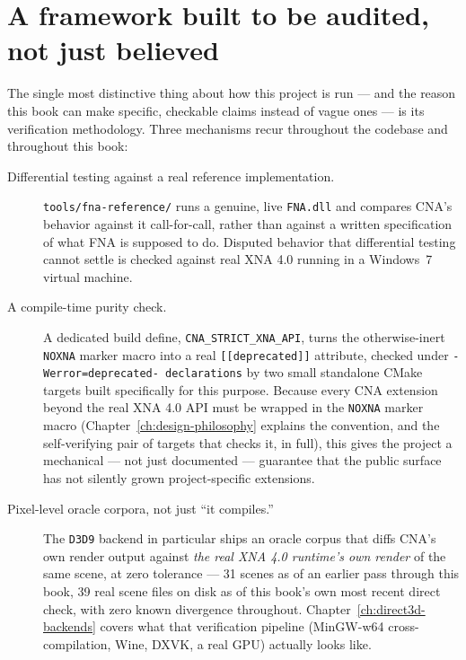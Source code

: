 \section{A framework built to be audited, not just believed}

The single most distinctive thing about how this project is run --- and the reason this book
can make specific, checkable claims instead of vague ones --- is its verification
methodology. Three mechanisms recur throughout the codebase and throughout this book:

\begin{description}
  \item[Differential testing against a real reference implementation.] \texttt{tools/fna-reference/}
        runs a genuine, live \texttt{FNA.dll} and compares CNA's behavior against it
        call-for-call, rather than against a written specification of what FNA is supposed to
        do. Disputed behavior that differential testing cannot settle is checked against real
        XNA 4.0 running in a Windows~7 virtual machine.
  \item[A compile-time purity check.] A dedicated build define, \texttt{CNA\_STRICT\_XNA\_API},
        turns the otherwise-inert \texttt{NOXNA} marker macro into a real
        \texttt{[[deprecated]]} attribute, checked under \texttt{-Werror=deprecated-%
        declarations} by two small standalone CMake targets built specifically for this
        purpose. Because every CNA extension beyond the real XNA 4.0 API must be wrapped in the
        \texttt{NOXNA} marker macro (Chapter~\ref{ch:design-philosophy} explains the
        convention, and the self-verifying pair of targets that checks it, in full), this gives
        the project a mechanical --- not just documented --- guarantee that the public
         surface has not silently grown project-specific
        extensions.
  \item[Pixel-level oracle corpora, not just ``it compiles.''] The \texttt{D3D9} backend in
        particular ships an oracle corpus that diffs CNA's own render output against
        \emph{the real XNA 4.0 runtime's own render} of the same scene, at zero tolerance ---
        31 scenes as of an earlier pass through this book, 39 real scene files on disk as of
        this book's own most recent direct check, with zero known divergence throughout.
        Chapter~\ref{ch:direct3d-backends}
        covers what that verification pipeline (MinGW-w64 cross-compilation, Wine, DXVK, a
        real GPU) actually looks like.
\end{description}

